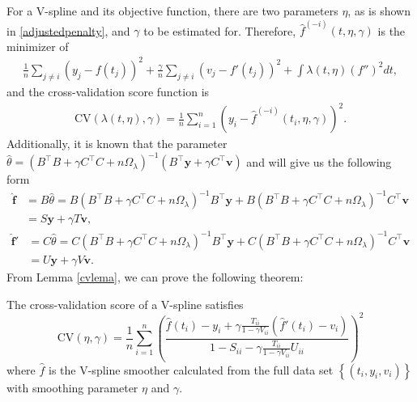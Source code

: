 For a V-spline and its objective function, there are two parameters $\eta$, as is shown in \eqref{adjustedpenalty}, and $\gamma$ to be estimated for. Therefore, $\hat{f}^{(-i)}(t,\eta,\gamma)$ is the minimizer of  
\begin{align}
\frac{1}{n}\sum_{j \neq i}\left( y_j-f(t_j) \right)^2+\frac{\gamma}{n}\sum_{j \neq i} \left( v_j-f'(t_j) \right)^2+ \int \lambda(t,\eta) \left( f'' \right)^2dt,
\end{align}
and the cross-validation score function is
\begin{align}
\mbox{CV}\left(\lambda(t,\eta),\gamma\right)=\frac{1}{n}\sum_{i=1}^{n}\left( y_i-\hat{f}^{(-i)}\left(t_i,\eta,\gamma\right) \right) ^2.
\end{align}
Additionally, it is known that the parameter $\hat{\theta}=\left(B^\top B+\gamma C^\top C+n\Omega_\lambda\right)^{-1}\left(B^\top\mathbf{y}+\gamma C^\top\mathbf{v}\right)$ and will give us the following form \small
\begin{equation}
\begin{split}
 \hat{\mathbf{f}}&=B\hat{\theta}=B\left(B^\top B+\gamma C^\top C+n\Omega_\lambda\right)^{-1}B^\top\mathbf{y}+B\left(B^\top B+\gamma C^\top C+n\Omega_\lambda\right)^{-1} C^\top\mathbf{v}\\&=S\mathbf{y}+\gamma T\mathbf{v},
 \end{split}
 \end{equation}
 \begin{equation}
 \begin{split}
\hat{\mathbf{f}}'&=C\hat{\theta}=C\left(B^\top B+\gamma C^\top C+n\Omega_\lambda\right)^{-1}B^\top\mathbf{y}+C\left(B^\top B+\gamma C^\top C+n\Omega_\lambda\right)^{-1}C^\top \mathbf{v}\\&=U\mathbf{y}+\gamma V\mathbf{v}.
 \end{split}
\end{equation}\normalsize
From Lemma \ref{cvlema}, we can prove the following theorem: 
\begin{theorem}\label{tractorsplinecvscore}
The cross-validation score of a V-spline satisfies
\begin{equation}\label{tractorcv}
\mbox{CV}\left(\eta,\gamma\right)=\frac{1}{n}\sum_{i=1}^{n} \left( \frac{\hat{f}(t_i)-y_i+\gamma \frac{T_{ii}}{1-\gamma V_{ii}}(\hat{f}'(t_i)-v_i)}{1-S_{ii}-\gamma\frac{T_{ii}}{1-\gamma V_{ii}}U_{ii}} \right)^2
\end{equation}
where $\hat{f}$ is the V-spline smoother calculated from the full data set $\left\lbrace (t_i,y_i,v_i)\right\rbrace$ with smoothing parameter $\eta$ and $\gamma$.
\end{theorem}

